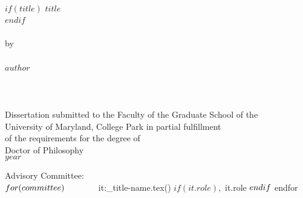 
\thispagestyle{empty} \hbox{\ } \vspace{1.5in}
\singlespacing
\small\normalsize
\begin{center}

$if(title)$
\large{\uppercase{$title$}}\\
$endif$
\ \\ 
\ \\
\large{by} \\
\ \\
\large{$author$}
\ \\
\ \\
\ \\
\ \\
\normalsize
Dissertation submitted to the Faculty of the Graduate School of the \\
University of Maryland, College Park in partial fulfillment \\
of the requirements for the degree of \\
Doctor of Philosophy \\
$year$
\end{center}

\vspace{7.5em}

\noindent Advisory Committee: \\
${ for(committee) }
\hbox{\ }\hspace{.5in}${it:_title-name.tex() }${ if(it.role) }, ${ it.role }${ endif } \\
${ endfor } 
